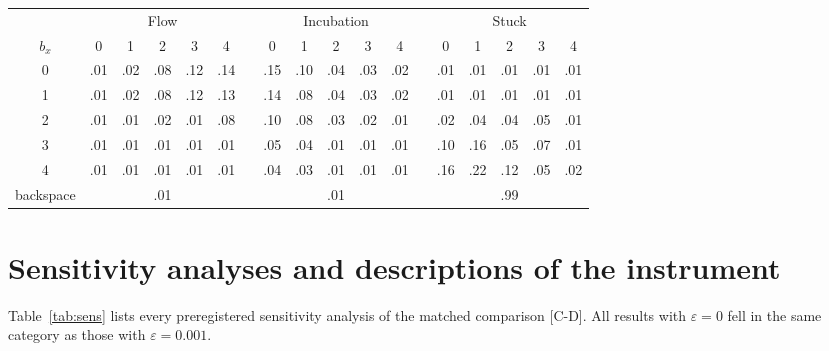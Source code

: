 \begin{center}\footnotesize
\setlength{\tabcolsep}{3pt}
\begin{tabular}{c ccccc c ccccc c ccccc}
  \toprule
  & \multicolumn{5}{c}{Flow} && \multicolumn{5}{c}{Incubation} && \multicolumn{5}{c}{Stuck} \\
  $b_x$ & 0 & 1 & 2 & 3 & 4 && 0 & 1 & 2 & 3 & 4 && 0 & 1 & 2 & 3 & 4 \\
  \midrule
  0 & .01 & .02 & .08 & .12 & .14 && .15 & .10 & .04 & .03 & .02 && .01 & .01 & .01 & .01 & .01 \\
  1 & .01 & .02 & .08 & .12 & .13 && .14 & .08 & .04 & .03 & .02 && .01 & .01 & .01 & .01 & .01 \\
  2 & .01 & .01 & .02 & .01 & .08 && .10 & .08 & .03 & .02 & .01 && .02 & .04 & .04 & .05 & .01 \\
  3 & .01 & .01 & .01 & .01 & .01 && .05 & .04 & .01 & .01 & .01 && .10 & .16 & .05 & .07 & .01 \\
  4 & .01 & .01 & .01 & .01 & .01 && .04 & .03 & .01 & .01 & .01 && .16 & .22 & .12 & .05 & .02 \\
  \midrule
  backspace & \multicolumn{5}{c}{.01} && \multicolumn{5}{c}{.01} && \multicolumn{5}{c}{.99} \\
  \bottomrule
\end{tabular}
\end{center}

\section{Sensitivity analyses and descriptions of the instrument}
\label{app:sensitivity}

Table~\ref{tab:sens} lists every preregistered sensitivity analysis of the matched comparison [C-D]. All results with
$\varepsilon = 0$ fell in the same category as those with $\varepsilon = 0.001$.

